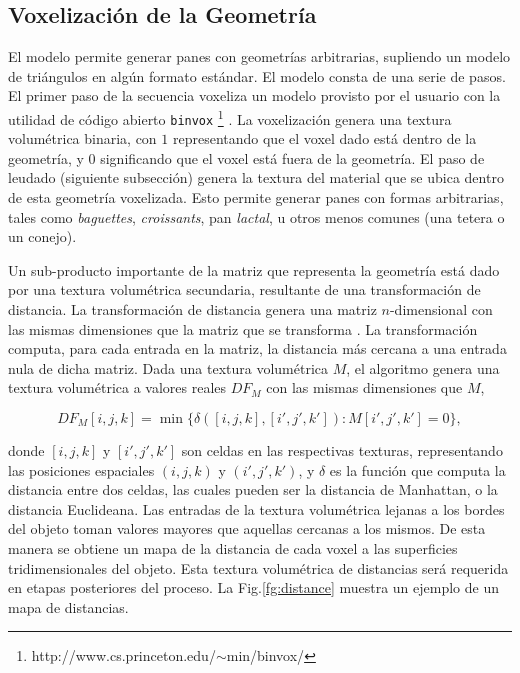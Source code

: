 
\subsection{Voxelización de la Geometría}

El modelo permite generar panes con geometrías arbitrarias, supliendo un modelo de triángulos en algún formato estándar.
El modelo consta de una serie de pasos. 
El primer paso de la secuencia voxeliza un modelo provisto por el usuario con la utilidad de código abierto {\tt binvox} \footnote{http://www.cs.princeton.edu/$\sim$min/binvox/} \cite{Nooruddin2003}.
La voxelización genera una textura volumétrica binaria, con $1$ representando que el voxel dado está dentro de la geometría, y $0$ significando que el voxel está fuera de la geometría.
El paso de leudado (siguiente subsección) genera la textura del material que se ubica dentro de esta geometría voxelizada.
Esto permite generar panes con formas arbitrarias, tales como {\em baguettes}, {\em croissants}, pan {\em lactal}, u otros menos comunes (una tetera o un conejo).

Un sub-producto importante de la matriz que representa la geometría está dado por una textura volumétrica secundaria, resultante de una transformación de distancia.
La transformación de distancia genera una matriz $n$-dimensional con las mismas dimensiones que la matriz que se transforma \cite{osh03}.
La transformación computa, para cada entrada en la matriz, la distancia más cercana a una entrada nula de dicha matriz.
Dada una textura volumétrica $M$, el algoritmo genera una textura volumétrica a valores reales $DF_{M}$ con las mismas dimensiones que $M$,


$$DF_{M}[i,j,k] = \min \bigg\{ \delta([i,j,k],[i',j',k']): M[i',j',k'] = 0 \bigg\},$$


\noindent donde $[i,j,k]$ y $[i',j',k']$ son celdas en las respectivas texturas, representando las posiciones espaciales $(i,j,k)$ y $(i',j',k')$, y $\delta$ es la función que computa la distancia entre dos celdas, las cuales pueden ser la distancia de Manhattan, o la distancia Euclideana.
Las entradas de la textura volumétrica lejanas a los bordes del objeto toman valores mayores que aquellas cercanas a los mismos.
De esta manera se obtiene un mapa de la distancia de cada voxel a las superficies tridimensionales del objeto.
Esta textura volumétrica de distancias será requerida en etapas posteriores del proceso.
La Fig.\ref{fg:distance} muestra un ejemplo de un mapa de distancias.

